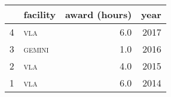 \begin{tabular}{rlrr}

\toprule & \multicolumn{1}{c}{facility} & \multicolumn{1}{c}{award (hours)}  & \multicolumn{1}{c}{year} \\ 
\midrule

4  &  \textsc{\MakeTextLowercase{VLA}}  &  6.0  &  2017\\

3  &  \textsc{\MakeTextLowercase{Gemini}}  &  1.0  &  2016\\

2  &  \textsc{\MakeTextLowercase{VLA}}  &  4.0  &  2015\\

1  &  \textsc{\MakeTextLowercase{VLA}}  &  6.0  &  2014\\

\bottomrule\end{tabular}
